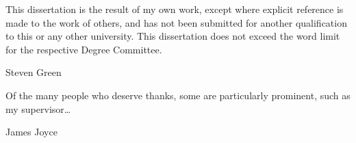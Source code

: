 \begin{declaration}
  This dissertation is the result of my own work, except where explicit
  reference is made to the work of others, and has not been submitted
  for another qualification to this or any other university. This
  dissertation does not exceed the word limit for the respective Degree
  Committee.
  \vspace*{1cm}
  \begin{flushright}
    Steven Green
  \end{flushright}
\end{declaration}


\begin{acknowledgements}
  Of the many people who deserve thanks, some are particularly prominent,
  such as my supervisor\dots
\end{acknowledgements}




\tableofcontents


%
  {James Joyce}
\thispagestyle{empty}
